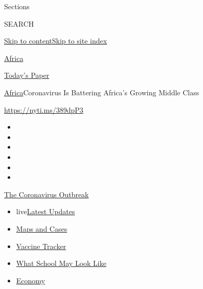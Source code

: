 Sections

SEARCH

\protect\hyperlink{site-content}{Skip to
content}\protect\hyperlink{site-index}{Skip to site index}

\href{https://www.nytimes.com/section/world/africa}{Africa}

\href{https://myaccount.nytimes.com/auth/login?response_type=cookie\&client_id=vi}{}

\href{https://www.nytimes.com/section/todayspaper}{Today's Paper}

\href{/section/world/africa}{Africa}\textbar{}Coronavirus Is Battering
Africa's Growing Middle Class

\url{https://nyti.ms/389dpP3}

\begin{itemize}
\item
\item
\item
\item
\item
\item
\end{itemize}

\href{https://www.nytimes.com/news-event/coronavirus?action=click\&pgtype=Article\&state=default\&region=TOP_BANNER\&context=storylines_menu}{The
Coronavirus Outbreak}

\begin{itemize}
\tightlist
\item
  live\href{https://www.nytimes.com/2020/08/01/world/coronavirus-covid-19.html?action=click\&pgtype=Article\&state=default\&region=TOP_BANNER\&context=storylines_menu}{Latest
  Updates}
\item
  \href{https://www.nytimes.com/interactive/2020/us/coronavirus-us-cases.html?action=click\&pgtype=Article\&state=default\&region=TOP_BANNER\&context=storylines_menu}{Maps
  and Cases}
\item
  \href{https://www.nytimes.com/interactive/2020/science/coronavirus-vaccine-tracker.html?action=click\&pgtype=Article\&state=default\&region=TOP_BANNER\&context=storylines_menu}{Vaccine
  Tracker}
\item
  \href{https://www.nytimes.com/interactive/2020/07/29/us/schools-reopening-coronavirus.html?action=click\&pgtype=Article\&state=default\&region=TOP_BANNER\&context=storylines_menu}{What
  School May Look Like}
\item
  \href{https://www.nytimes.com/live/2020/07/31/business/stock-market-today-coronavirus?action=click\&pgtype=Article\&state=default\&region=TOP_BANNER\&context=storylines_menu}{Economy}
\end{itemize}

